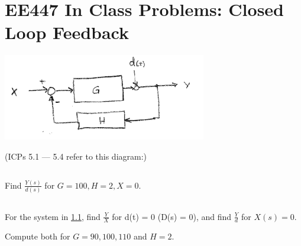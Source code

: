 \documentclass{article}	%
\begin{document}
%
%
%
%
%




\newpage
\section{EE447 In Class Problems: Closed Loop Feedback}

\includegraphics[width=3.5in]{00388a.png}

(ICPs 5.1 --- 5.4 refer to this diagram:)

\subsection{}\label{disturbancerej1}

Find $\frac{Y(s)}{d(s)}$ for $G=100, H=2, X = 0$. \\[0.15in]

%


\subsection{}
For the system in \ref{disturbancerej1}, find
$\frac{Y}{X}$ for d(t) = 0 (D(s) = 0), and find
$\frac{Y}{d}$ for $X(s) = 0$.

Compute both for $G = 90, 100, 110$ and $H=2$.\\[0.15in]

%
%
%
%
%
%
%
%
%
\end{document}
